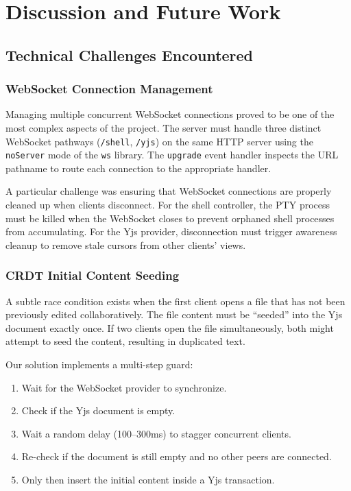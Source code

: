 \documentclass[12pt,a4paper,oneside]{report}
\begin{document}
\chapter{Discussion and Future Work}

\section{Technical Challenges Encountered}

\subsection{WebSocket Connection Management}

Managing multiple concurrent WebSocket connections proved to be one of the most complex aspects of the project. The server must handle three distinct WebSocket pathways (\texttt{/shell}, \texttt{/yjs}) on the same HTTP server using the \texttt{noServer} mode of the \texttt{ws} library. The \texttt{upgrade} event handler inspects the URL pathname to route each connection to the appropriate handler.

A particular challenge was ensuring that WebSocket connections are properly cleaned up when clients disconnect. For the shell controller, the PTY process must be killed when the WebSocket closes to prevent orphaned shell processes from accumulating. For the Yjs provider, disconnection must trigger awareness cleanup to remove stale cursors from other clients' views.

\subsection{CRDT Initial Content Seeding}

A subtle race condition exists when the first client opens a file that has not been previously edited collaboratively. The file content must be ``seeded'' into the Yjs document exactly once. If two clients open the file simultaneously, both might attempt to seed the content, resulting in duplicated text.

Our solution implements a multi-step guard:
\begin{enumerate}[label=\arabic*.]
    \item Wait for the WebSocket provider to synchronize.
    \item Check if the Yjs document is empty.
    \item Wait a random delay (100--300ms) to stagger concurrent clients.
    \item Re-check if the document is still empty and no other peers are connected.
    \item Only then insert the initial content inside a Yjs transaction.
\end{enumerate}
\end{document}
